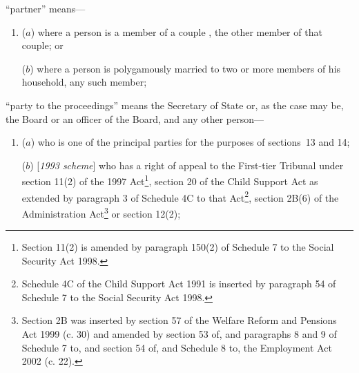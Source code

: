 \documentclass[12pt,a4paper]{article}
\begin{document}
\begin{enumerate}


“partner” means—
\begin{enumerate}\item[]
    ($a$) 
    where a person is a member of 
a couple%
, the other member of that couple; or

    ($b$) 
    where a person is polygamously married to two or more members of his household, any such member;
\end{enumerate}

“party to the proceedings” means the Secretary of State 
or, as the case may be, the Board or an officer of the Board,  %
and any other person—
\begin{enumerate}\item[]
($a$) who is one of the principal parties for the purposes of sections~13 and 14;

($b$) [\emph{1993 scheme}] who has a right of appeal to 
the First-tier Tribunal  %
under section 11(2) of the 1997 Act\footnote{\frenchspacing Section 11(2) is amended by paragraph 150(2) of Schedule 7 to the Social Security Act 1998.}, section 20 of the Child Support Act as extended by paragraph 3 of Schedule 4C to that Act\footnote{\frenchspacing Schedule 4C of the Child Support Act 1991 is inserted by paragraph 54 of Schedule 7 to the Social Security Act 1998.}, section 2B(6) of the Administration Act\footnote{Section 2B was inserted by section 57 of the Welfare Reform and Pensions Act 1999 (c. 30) and amended by section 53 of, and paragraphs 8 and 9 of Schedule 7 to, and section 54 of, and Schedule 8 to, the Employment Act 2002 (c. 22).}  %
or section 12(2);


\end{enumerate}
\end{enumerate}
\end{document}
